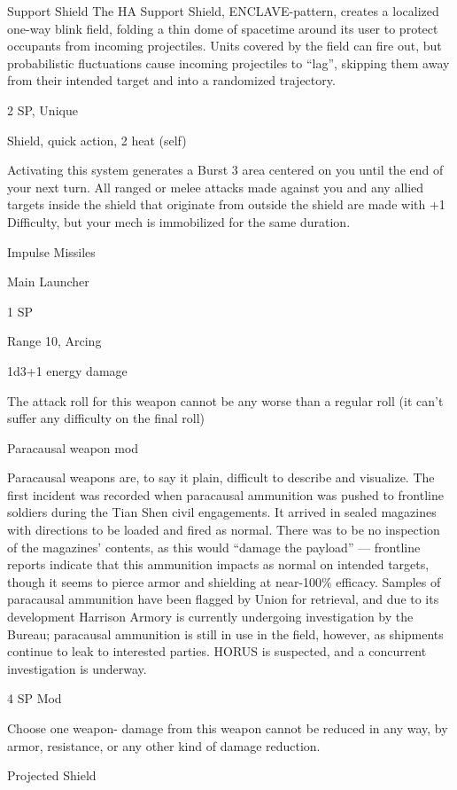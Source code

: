 \begin{mech}
Support Shield
The HA Support Shield, ENCLAVE-pattern, creates a localized one-way blink field, folding a thin dome of spacetime around its user to protect occupants from incoming projectiles. Units covered by the field can fire out, but probabilistic fluctuations cause incoming projectiles to “lag”, skipping them away from their intended target and into a randomized trajectory.

2 SP, Unique

Shield, quick action, 2 heat (self)

Activating this system generates a Burst 3 area centered on you until the end of your next turn. All ranged or melee attacks made against you and any allied targets inside the shield that originate from outside the shield are made with +1 Difficulty, but your mech is immobilized for the same duration.


Impulse Missiles

Main Launcher

1 SP

Range 10, Arcing

1d3+1 energy damage

The attack roll for this weapon cannot be any worse than a regular roll (it can’t suffer any difficulty on the final roll)


Paracausal weapon mod

Paracausal weapons are, to say it plain, difficult to describe and visualize. The first incident was recorded when paracausal ammunition was pushed to frontline soldiers during the Tian Shen civil engagements. It arrived in sealed magazines with directions to be loaded and fired as normal. There was to be no inspection of the magazines’ contents, as this would “damage the payload” — frontline reports indicate that this ammunition impacts as normal on intended targets, though it seems to pierce armor and shielding at near-100\% efficacy. Samples of paracausal ammunition have been flagged by Union for retrieval, and due to its development Harrison Armory is currently undergoing investigation by the Bureau; paracausal ammunition is still in use in the field, however, as shipments continue to leak to interested parties. HORUS is suspected, and a concurrent investigation is underway.

4 SP
Mod

Choose one weapon- damage from this weapon cannot be reduced in any way, by armor, resistance, or any other kind of damage reduction.


Projected Shield


\end{mech}
